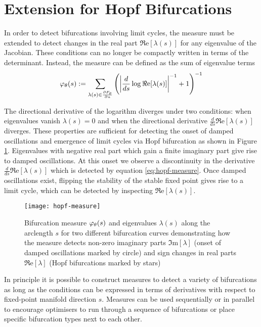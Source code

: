 \clearpage
\section{Extension for Hopf Bifurcations}
\label{appendix:hopf}

In order to detect bifurcations involving limit cycles, the measure must be extended to detect changes in the real part $\Re\mathrm{e}[\lambda(s)]$ for any eigenvalue of the Jacobian. These conditions can no longer be compactly written in terms of the determinant. Instead, the measure can be defined as the sum of eigenvalue terms 
\begin{align}
    \varphi_{\theta}(s):=\sum_{\lambda(s)\in\frac{\partial F_{\theta}}{\partial u}}
    \left(\left|\frac{d}{ds}\log\Re\mathrm{e}[\lambda(s)]\right|^{-1}+1\right)^{-1}
    \label{eq:hopf-measure}
\end{align}

The directional derivative of the logarithm diverges under two conditions: when eigenvalues vanish $\lambda(s)=0$ and when the directional derivative $\frac{d}{ds}\Re\mathrm{e}[\lambda(s)]$ diverges. These properties are sufficient for detecting the onset of damped oscillations and emergence of limit cycles via Hopf bifurcation as shown in Figure \ref{fig:hopf-measure}. Eigenvalues with negative real part which gain a finite imaginary part give rise to damped oscillations. At this onset we observe a discontinuity in the derivative $\frac{d}{ds}\Re\mathrm{e}[\lambda(s)]$ which is detected by equation \eqref{eq:hopf-measure}. Once damped oscillations exist, flipping the stability of the stable fixed point gives rise to a limit cycle, which can be detected by inspecting $\Re\mathrm{e}[\lambda(s)]$.

\begin{figure}[H]
\centering
    \texttt{[image: hopf-measure]}
    \caption{Bifurcation measure $\varphi_{\theta}(s)$ and eigenvalues $\lambda(s)$ along the arclength $s$ for two different bifurcation curves demonstrating how the measure detects non-zero imaginary parts $\Im\mathrm{m}[\lambda]$ (onset of damped oscillations marked by circle) and sign changes in real parts $\Re\mathrm{e}[\lambda]$ (Hopf bifurcations marked by stars)}
    \label{fig:hopf-measure}
\end{figure}

In principle it is possible to construct measures to detect a variety of bifurcations as long as the conditions can be expressed in terms of derivatives with respect to fixed-point manifold direction $s$. Measures can be used sequentially or in parallel to encourage optimisers to run through a sequence of bifurcations or place specific bifurcation types next to each other.
